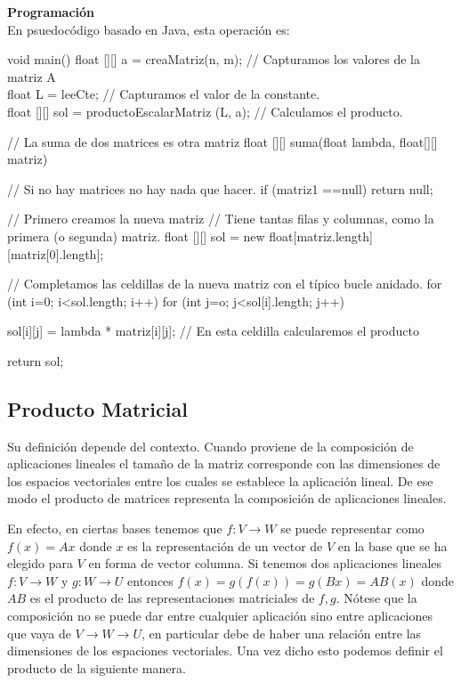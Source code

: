 \documentclass[10pt]{article}
\begin{document}
\noindent\textbf{Programación} \\

En psuedocódigo basado en Java, esta operación es:

\begin{code}[caption=Suma de Matrices, label=default]
void main() {
  float [][] a = creaMatriz(n, m); // Capturamos los valores de la matriz A \\
  float L = leeCte; // Capturamos el valor de la constante. \\
  float [][] sol = productoEscalarMatriz (L, a); // Calculamos el producto. \\
} 

// La suma de dos matrices es otra matriz
float [][] suma(float lambda, float[][] matriz) {
   // Si no hay matrices no hay nada que hacer.
   if (matriz1 ==null) return null;
   
   // Primero creamos la nueva matriz
   // Tiene tantas filas y columnas, como la primera (o segunda) matriz.
   float [][] sol = new float[matriz.length][matriz[0].length];
   
   // Completamos las celdillas de la nueva matriz con el típico bucle anidado.
   for (int i=0; i<sol.length; i++)
     for (int j=o; j<sol[i].length; j++)
     
       sol[i][j] = lambda * matriz[i][j]; // En esta celdilla calcularemos el producto
       
   return sol;
}    
\end{code}
\subsection{Producto Matricial}

Su definición depende del contexto. Cuando proviene de la composición de aplicaciones lineales el tamaño de la matriz corresponde con las dimensiones de los espacios vectoriales entre los cuales se establece la aplicación lineal. De ese modo el producto de matrices representa la composición de aplicaciones lineales.

En efecto, en ciertas bases tenemos que $f : V \longrightarrow W$ se puede representar como $f(x) = Ax$ donde $x$ es la representación de un vector de $V$ en la base que se ha elegido para $V$ en forma de vector columna. Si tenemos dos aplicaciones lineales $f : V \longrightarrow W$ y $g : W \longrightarrow U$ entonces $f(x) = g(f(x)) = g(Bx) = AB(x)$ donde $AB$ es el producto de las representaciones matriciales de $f, g$. Nótese que la composición no se puede dar entre cualquier aplicación sino entre aplicaciones que vaya de $V \rightarrow W \rightarrow U$, en particular debe de haber una relación entre las dimensiones de los espaciones vectoriales. Una vez dicho esto podemos definir el producto de la siguiente manera. \\
\end{document}
